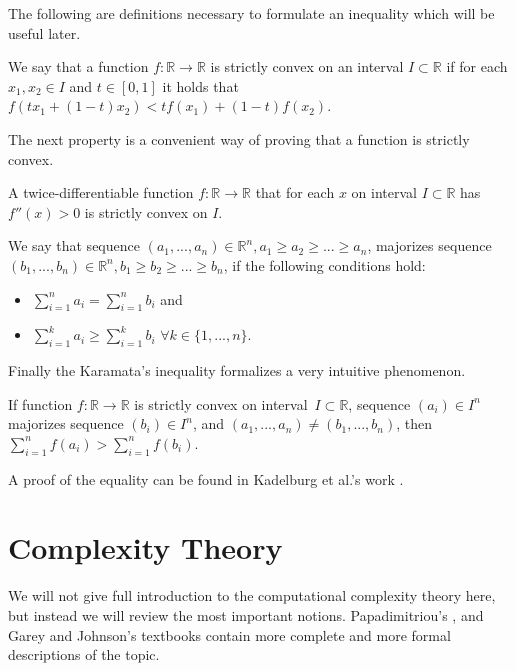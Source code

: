 The following are definitions necessary to formulate an inequality which will be useful later.

\begin{defn}
We say that a function $f:\mathbb{R}\rightarrow\mathbb{R}$ is strictly convex on an interval $I \subset \mathbb{R}$
if for each $x_1, x_2 \in I$ and $t \in [0,1]$ it holds that $f(t x_1 + (1-t) x_2) < tf(x_1) + (1-t)f(x_2)$.
\end{defn}

The next property is a convenient way of proving that a function is strictly convex.

\begin{prp}
A twice-differentiable function $f:\mathbb{R}\rightarrow\mathbb{R}$
that for each $x$ on interval $I \subset \mathbb{R}$ has $f''(x) > 0$
is strictly convex on $I$.
\end{prp}

\begin{defn}[majorization]
We say that sequence $(a_1, ..., a_n) \in \mathbb{R}^n, a_1 \geq a_2 \geq ... \geq a_n$,
majorizes sequence $(b_1, ..., b_n) \in \mathbb{R}^n, b_1 \geq b_2 \geq ... \geq b_n$,
if the following conditions hold:
\begin{itemize}
	\item $\sum_{i=1}^n a_i = \sum_{i=1}^n b_i$ and
	\item $\sum_{i=1}^k a_i \geq \sum_{i=1}^k b_i$ $\forall k \in \{ 1, ..., n\}$.
\end{itemize}
\end{defn}

Finally the Karamata's inequality formalizes a very intuitive phenomenon.

\begin{thm} \label{thm:Kar}
If function $f:\mathbb{R}\rightarrow\mathbb{R}$ is strictly convex on interval~$I \subset \mathbb{R}$,
sequence $(a_i) \in I^n$ majorizes sequence $(b_i) \in I^n$,
and $(a_1, ..., a_n) \neq (b_1, ..., b_n)$, then
$\sum_{i=1}^n f(a_i) > \sum_{i=1}^n f(b_i)$.
\end{thm}

A proof of the equality can be found in Kadelburg et al.'s work \cite{karamata}.

\section{Complexity Theory}

We will not give full introduction to the computational complexity theory here,
but instead we will review the most important notions.
Papadimitriou's \cite{compcomplexity}, and Garey and Johnson's \cite{computersandintractability} textbooks
contain more complete and more formal descriptions of the topic.


